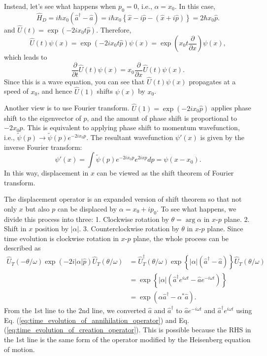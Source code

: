 \documentclass{book}
\begin{document}
Instead, let's see what happens when $p_0 = 0$, i.e., $\alpha = x_0$. In this case,
 \begin{equation}
  \hat H_D = i\hbar x_0(\hat a^\dagger - \hat a) = i\hbar x_0\left\{\hat x-i\hat p - (\hat x +i\hat p)\right\} = 2\hbar x_0 \hat p.
\end{equation}
and $\hat U(t) = \exp(-2ix_0t\hat p)$. Therefore,
\begin{equation}
  \hat U(t)\psi(x) = \exp(-2ix_0t\hat p)\psi(x) = \exp\left(x_0t\frac{\partial }{\partial x}\right) \psi(x),
\end{equation}
which leads to
\begin{equation}
  \frac{\partial}{\partial t}\hat U(t)\psi(x) = x_0\frac{\partial}{\partial x}\hat U(t)\psi(x).
\end{equation}
Since this is a wave equation, you can see that $\hat U(t)\psi(x)$ propagates at a speed of $x_0$, and hence $\hat U(1)$ shifts $\psi(x)$ by $x_0$.

Another view is to use Fourier transform. $\hat U(1) = \exp(-2ix_0\hat p)$ applies phase shift to the eigenvector of $p$, and the amount of phase shift is proportional to $-2x_0p$. This is equivalent to applying phase shift to momentum wavefunction, i.e., $\tilde\psi(p) \to \tilde\psi(p)e^{-2ix_0p}$. The resultant wavefunction $\psi'(x)$ is given by the inverse Fourier transform:
\begin{equation}
  \psi'(x) = \int \tilde \psi(p)e^{-2ix_0p}e^{2ixp}dp = \psi(x-x_0).
\end{equation}
In this way, displacement in $x$ can be viewed as the shift theorem of Fourier transform. 

The displacement operator is an expanded version of shift theorem so that not only $x$ but also $p$ can be displaced by $\alpha = x_0 + ip_0$. To see what happens, we divide this process into three: 1. Clockwise rotation by $\theta = \arg \alpha$ in $x$-$p$ plane. 2. Shift in $x$ position by $|\alpha|$. 3. Counterclockwise rotation by $\theta$ in $x$-$p$ plane. Since time evolution is clockwise rotation in $x$-$p$ plane, the whole process can be described as
\begin{equation}
\begin{aligned}
  \hat U_T(-\theta/\omega)\exp(-2i|\alpha|\hat p)\hat U_T(\theta/\omega) &= \hat U_T^\dagger(\theta/\omega)\exp\left\{|\alpha|(\hat a^\dagger - \hat a)\right\}\hat U_T(\theta/\omega)\\
  &= \exp\left\{ |\alpha|(\hat a^\dagger e^{i\omega t} - \hat ae^{-i\omega t})\right\}\\
  &= \exp(\alpha \hat a^\dagger - \alpha^* \hat a).
\end{aligned}
\end{equation}
From the 1st line to the 2nd line, we converted $\hat a$ and $\hat a^\dagger$ to $\hat ae^{-i\omega t}$ and $\hat a^\dagger e^{i\omega t}$ using Eq. (\ref{eq:time_evolution_of_annihilation_operator}) and Eq. (\ref{eq:time_evolution_of_creation_operator}). This is possible because the RHS in the 1st line is the same form of the operator modified by the Heisenberg equation of motion.
\end{document}
